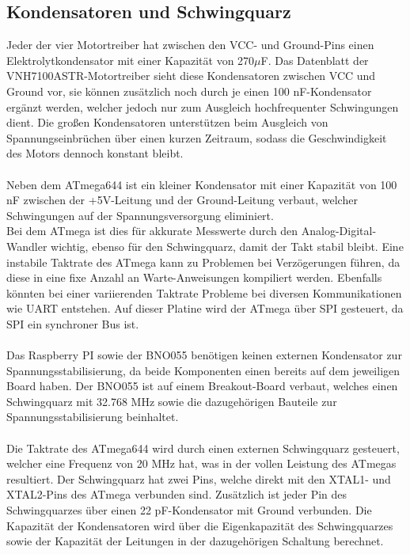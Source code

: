 \documentclass[12pt]{article}
\begin{document}
\subsection{Kondensatoren und Schwingquarz}
Jeder der vier Motortreiber hat zwischen den VCC- und Ground-Pins einen Elektrolytkondensator mit einer Kapazität von 270$\mu$F. Das Datenblatt der VNH7100ASTR-Motortreiber sieht diese Kondensatoren zwischen VCC und Ground vor, sie können zusätzlich noch durch je einen 100 nF-Kondensator ergänzt werden, welcher jedoch nur zum Ausgleich hochfrequenter Schwingungen dient. Die großen Kondensatoren unterstützen beim Ausgleich von Spannungseinbrüchen über einen kurzen Zeitraum, sodass die Geschwindigkeit des Motors dennoch konstant bleibt. 
\\\\Neben dem ATmega644 ist ein kleiner Kondensator mit einer Kapazität von 100 nF zwischen der +5V-Leitung und der Ground-Leitung verbaut, welcher Schwingungen auf der Spannungsversorgung eliminiert.\\
Bei dem ATmega ist dies für akkurate Messwerte durch den Analog-Digital-Wandler wichtig, ebenso für den Schwingquarz, damit der Takt stabil bleibt. Eine instabile Taktrate des ATmega kann zu Problemen bei Verzögerungen führen, da diese in eine fixe Anzahl an Warte-Anweisungen kompiliert werden. Ebenfalls könnten bei einer variierenden Taktrate Probleme bei diversen Kommunikationen wie UART entstehen. Auf dieser Platine wird der ATmega über SPI gesteuert, da SPI ein synchroner Bus ist.
\\\\Das Raspberry PI sowie der BNO055 benötigen keinen externen Kondensator zur Spannungsstabilisierung, da beide Komponenten einen bereits auf dem jeweiligen Board haben. Der BNO055 ist auf einem Breakout-Board verbaut, welches einen Schwingquarz mit 32.768 MHz sowie die dazugehörigen Bauteile zur Spannungsstabilisierung beinhaltet.
\\\\Die Taktrate des ATmega644 wird durch einen externen Schwingquarz gesteuert, welcher eine Frequenz von 20 MHz hat, was in der vollen Leistung des ATmegas resultiert. Der Schwingquarz hat zwei Pins, welche direkt mit den XTAL1- und XTAL2-Pins des ATmega verbunden sind. Zusätzlich ist jeder Pin des Schwingquarzes über einen 22 pF-Kondensator mit Ground verbunden. Die Kapazität der Kondensatoren wird über die Eigenkapazität des Schwingquarzes sowie der Kapazität der Leitungen in der dazugehörigen Schaltung berechnet.
\end{document}

